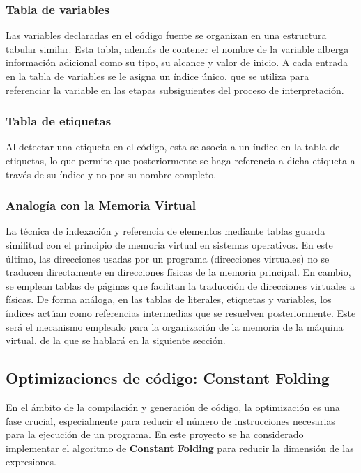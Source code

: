 \subsubsection{Tabla de variables}
Las variables declaradas en el código fuente se organizan en una estructura tabular similar. Esta tabla, además de contener el nombre de la variable alberga información adicional como su tipo, su alcance y valor de inicio. A cada entrada en la tabla de variables se le asigna un índice único, que se utiliza para referenciar la variable en las etapas subsiguientes del proceso de interpretación.

\subsubsection{Tabla de etiquetas}
Al detectar una etiqueta en el código, esta se asocia a un índice en la tabla de etiquetas, lo que permite que posteriormente se haga referencia a dicha etiqueta a través de su índice y no por su nombre completo.

\subsubsection{Analogía con la Memoria Virtual}
La técnica de indexación y referencia de elementos mediante tablas guarda similitud con el principio de memoria virtual en sistemas operativos. En este último, las direcciones usadas por un programa (direcciones virtuales) no se traducen directamente en direcciones físicas de la memoria principal. En cambio, se emplean tablas de páginas que facilitan la traducción de direcciones virtuales a físicas. De forma análoga, en las tablas de literales, etiquetas y variables, los índices actúan como referencias intermedias que se resuelven posteriormente. Este será el mecanismo empleado para la organización de la memoria de la máquina virtual, de la que se hablará en la siguiente sección.

\subsection{Optimizaciones de código: Constant Folding}
En el ámbito de la compilación y generación de código, la optimización es una fase crucial, especialmente para reducir el número de instrucciones necesarias para la ejecución de un programa. En este proyecto se ha considerado implementar el algoritmo de \textbf{Constant Folding} para reducir la dimensión de las expresiones.

